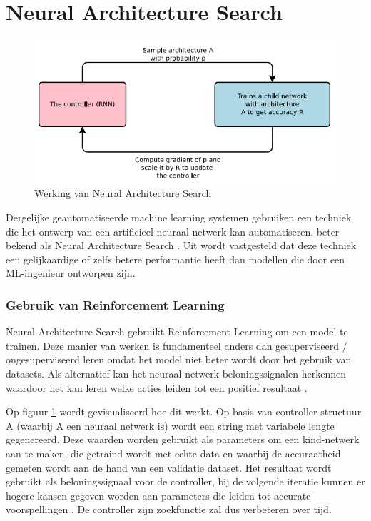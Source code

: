 \section{Neural Architecture Search}

\begin{figure}
    \includegraphics[width=\linewidth]{img/nas.png}
    \caption{Werking van Neural Architecture Search}
    \label{fig:nas-bp}
\end{figure}

Dergelijke geautomatiseerde machine learning systemen gebruiken een techniek die het ontwerp van een artificieel neuraal netwerk kan automatiseren, beter bekend als Neural Architecture Search \autocite{Elsken2019}. Uit \textcite{ZophL2016} wordt vastgesteld dat deze techniek een gelijkaardige of zelfs betere performantie heeft dan modellen die door een ML-ingenieur ontworpen zijn.

\subsubsection{Gebruik van Reinforcement Learning}

Neural Architecture Search gebruikt Reinforcement Learning om een model te trainen. Deze manier van werken is fundamenteel anders dan gesuperviseerd / ongesuperviseerd leren omdat het model niet beter wordt door het gebruik van datasets. Als alternatief kan het neuraal netwerk beloningssignalen herkennen waardoor het kan leren welke acties leiden tot een positief resultaat \autocite{Lievens2019}.

Op figuur \ref{fig:nas-bp} wordt gevisualiseerd hoe dit werkt. Op basis van controller structuur A (waarbij A een neuraal netwerk is) wordt een string met variabele lengte gegenereerd. Deze waarden worden gebruikt als parameters om een kind-netwerk aan te maken, die getraind wordt met echte data en waarbij de accuraatheid gemeten wordt aan de hand van een validatie dataset. Het resultaat wordt gebruikt als beloningssignaal voor de controller, bij de volgende iteratie kunnen er hogere kansen gegeven worden aan parameters die leiden tot accurate voorspellingen \autocite{ZophL2016}. De controller zijn zoekfunctie zal dus verbeteren over tijd.

